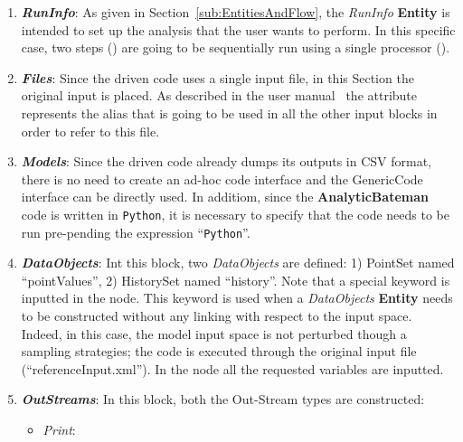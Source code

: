  \begin{enumerate}
   \item \textbf{\textit{RunInfo}}:
   As given in Section~\ref{sub:EntitiesAndFlow}, the \textit{RunInfo} \textbf{Entity} is intended to set up the analysis
   that the user wants to perform. In this specific case, two steps () are going to be sequentially run
   using a single processor ().

   \item \textbf{\textit{Files}}:
   Since the driven code uses a single input file, in this Section the original input is placed. As described in the user manual~\cite{}
   the attribute   represents the alias that is going to be used in all the other input blocks in order to
   refer to this file.
   \item \textbf{\textit{Models}}:
  Since the driven code already dumps its outputs in CSV format, there is no need to create
  an ad-hoc code interface and the GenericCode interface can be directly used. In additiom, since the \textbf{AnalyticBateman} code
  is written in \texttt{Python}, it is necessary to specify that the code needs to be run pre-pending the expression ``\texttt{Python}''.
   \item \textbf{\textit{DataObjects}}:
  Int this block, two \textit{DataObjects} are defined: 1) PointSet named ``pointValues'', 2) HistorySet named ``history''.
  Note that a special keyword is inputted in the  node. This keyword is used when a \textit{DataObjects}  \textbf{Entity} needs to be constructed without any linking with respect to the input space. Indeed, in
  this case, the model input space is not perturbed though a sampling strategies; the code is executed through the original
   input file   (``referenceInput.xml''). In the  node all the requested variables are inputted.
   \item \textbf{\textit{OutStreams}}:
  In this block, both the Out-Stream types are constructed:
  \begin{itemize}
    \item \textit{Print}:

\end{itemize}
\end{enumerate}
